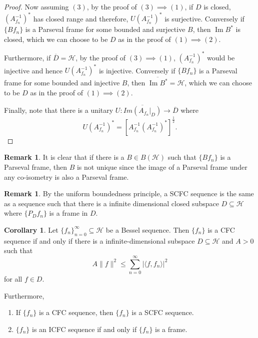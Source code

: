\documentclass[11pt]{amsart}
\theoremstyle{definition}
\newtheorem{cor}{Corollary}[section]
\newtheorem{rem}[thm]{Remark}
\numberwithin{equation}{section}
\newcommand{\Hcal}{\mathcal{H}} %
\begin{document}
\begin{proof}
Now assuming $(3)$, by the proof of $(3)\implies (1)$, if $D$ is closed, $(A^{-1}_{f_n})^{*}$ has closed range and therefore, $U(A^{-1}_{f_n})^{*}$ is surjective. Conversely if $\{Bf_n\}$ is a Parseval frame for some bounded and surjective $B$, then $\operatorname{Im}B^{*}$ is closed, which we can choose to be $D$ as in the proof of $(1)\implies (2)$.

Furthermore, if $\overline{D}=\Hcal$, 
by the proof of $(3)\implies (1)$, $(A_{f_n}^{-1})^{*}$ would be injective and hence $U(A^{-1}_{f_n})^{*}$ is injective. Conversely if $\{Bf_n\}$ is a Parseval frame for some bounded and injective $B$, then $\overline{\operatorname{Im}B^{*}}=\Hcal$, which we can choose to be $D$ as in the proof of $(1)\implies (2)$.

Finally, note that there is a unitary $U: \overline{Im(A_{f_n}|_{D})}\to \overline{D}$ where $$U(A_{f_n}^{-1})^{*}=[A_{f_n}^{-1}(A_{f_n}^{-1})^{*}]^{\frac{1}{2}}.$$
\end{proof}

\begin{rem}
It is clear that if there is a $B\in B(\Hcal)$ such that $\{Bf_n\}$ is a Parseval frame, then $B$ is not unique since the image of a Parseval frame under any co-isometry is also a Parseval frame.
\end{rem}

\begin{rem}
By the uniform boundedness principle, a SCFC sequence is the same as a sequence such that there is a infinite dimensional closed subspace $D\subseteq \Hcal$ where $\{P_{D}f_n\}$ is a frame in $D$.
\end{rem}

\begin{cor}
Let $\{f_n\}_{n=0}^{\infty}\subseteq \Hcal$ be a Bessel sequence. Then $\{f_n\}$ is a CFC sequence if and only if there is a infinite-dimensional subspace $D\subseteq \Hcal$ and $A>0$ such that $$A\|f\|^{2}\leq \sum_{n=0}^{\infty}|\langle f, f_n\rangle|^{2}$$ for all $f\in D.$

Furthermore,

\begin{enumerate}
    \item If $\{f_n\}$ is a CFC sequence, then $\{f_n\}$ is a SCFC sequence.
    \item $\{f_n\}$ is an ICFC sequence if and only if $\{f_n\}$ is a frame.
\end{enumerate} 
\end{cor}
\end{document}

